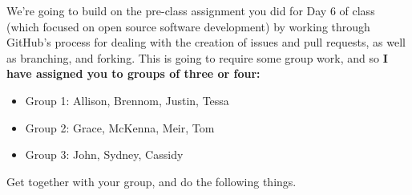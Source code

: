 \documentclass[10pt]{article}
\begin{document}
\vspace{5mm}
\noindent\makebox[\linewidth]{\rule{0.76\paperwidth}{0.4pt}}
\vspace{2mm}

We're going to build on the pre-class assignment you did for Day 6 of
class (which focused on open source software development) by working
through GitHub's process for dealing with the creation of issues and
pull requests, as well as branching, and forking.  This is going to
require some group work, and so \textbf{I have assigned you to
groups of three or four:}

\begin{itemize}

\item  Group 1:  Allison, Brennom, Justin, Tessa
\vspace{-2mm}

\item  Group 2:  Grace, McKenna, Meir, Tom

\vspace{-2mm}
\item  Group 3:  John, Sydney, Cassidy

\end{itemize}

\noindent
Get together with your group, and do the following things.
\end{document}
